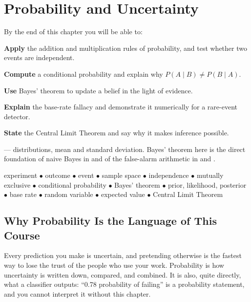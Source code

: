 \chapter{Probability and Uncertainty}\label{ch:probability}

\begin{outcomes}
By the end of this chapter you will be able to:
\begin{tight}
  \item \textbf{Apply} the addition and multiplication rules of probability, and test whether two events are independent.
  \item \textbf{Compute} a conditional probability and explain why $P(A \mid B) \neq P(B \mid A)$.
  \item \textbf{Use} Bayes' theorem to update a belief in the light of evidence.
  \item \textbf{Explain} the base-rate fallacy and demonstrate it numerically for a rare-event detector.
  \item \textbf{State} the Central Limit Theorem and say why it makes inference possible.
\end{tight}
\end{outcomes}

\begin{prereq}
 --- distributions, mean and standard deviation. Bayes'
theorem here is the direct foundation of naive Bayes in  and
of the false-alarm arithmetic in  and .
\end{prereq}

\begin{keyterms}
experiment $\bullet$ outcome $\bullet$ event $\bullet$ sample space $\bullet$
independence $\bullet$ mutually exclusive $\bullet$ conditional probability
$\bullet$ Bayes' theorem $\bullet$ prior, likelihood, posterior $\bullet$ base rate
$\bullet$ random variable $\bullet$ expected value $\bullet$ Central Limit Theorem
\end{keyterms}

\section{Why Probability Is the Language of This Course}

Every prediction you make is uncertain, and pretending otherwise is the fastest
way to lose the trust of the people who use your work. Probability is how
uncertainty is written down, compared, and combined. It is also, quite directly,
what a classifier outputs: ``0.78 probability of failing'' is a probability
statement, and you cannot interpret it without this chapter.


